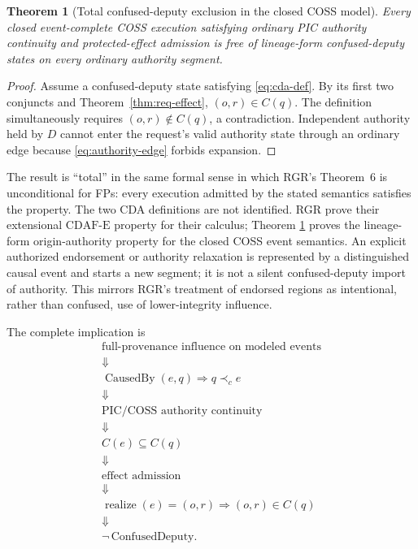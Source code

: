 \documentclass[10pt,twocolumn]{article}
\newcommand{\Model}{\textnormal{\textsc{COSS}}\xspace}
\newcommand{\CDAF}{\mathrm{CDAF\text{-}E}}
\newcommand{\CausedBy}{\operatorname{CausedBy}}
\newcommand{\Realize}{\operatorname{realize}}
\newcommand{\hb}{\prec_{c}}
\newtheorem{theorem}{Theorem}
\begin{document}
\begin{theorem}[Total confused-deputy exclusion in the closed \Model model]
\label{thm:total-cda}
Every closed event-complete \Model execution satisfying ordinary PIC authority
continuity and protected-effect admission is free of lineage-form
confused-deputy states on every ordinary authority segment.
\end{theorem}

\begin{proof}
Assume a confused-deputy state satisfying \eqref{eq:cda-def}. By its first two
conjuncts and Theorem~\ref{thm:req-effect}, $(o,r)\in C(q)$. The definition
simultaneously requires $(o,r)\notin C(q)$, a contradiction. Independent
authority held by $D$ cannot enter the request's valid authority state through
an ordinary edge because \eqref{eq:authority-edge} forbids expansion.
\end{proof}

The result is ``total'' in the same formal sense in which RGR's Theorem~6 is
unconditional for FPs: every execution admitted by the stated semantics
satisfies the property. The two CDA definitions are not identified. RGR prove
their extensional $\CDAF$ property for their calculus; Theorem
\ref{thm:total-cda} proves the lineage-form origin-authority property for the
closed \Model event semantics. An explicit authorized endorsement or authority
relaxation is represented by a distinguished causal event and starts a new
segment; it is not a silent confused-deputy import of authority. This mirrors
RGR's treatment of endorsed regions as intentional, rather than confused, use
of lower-integrity influence.

The complete implication is
\begin{equation}
\boxed{
\begin{gathered}
\text{full-provenance influence on modeled events}\\
\Downarrow\\
\CausedBy(e,q)\Rightarrow q\hb e\\
\Downarrow\\
\text{PIC/COSS authority continuity}\\
\Downarrow\\
C(e)\subseteq C(q)\\
\Downarrow\\
\text{effect admission}\\
\Downarrow\\
\Realize(e)=(o,r)\Rightarrow(o,r)\in C(q)\\
\Downarrow\\
\neg\,\text{ConfusedDeputy}.
\end{gathered}}
\label{eq:full-cda-chain}
\end{equation}
\end{document}
